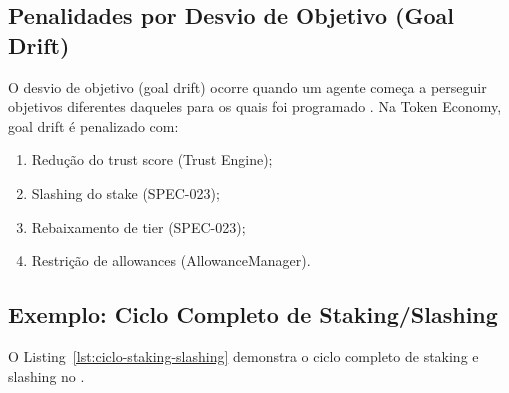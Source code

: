 \subsection{Penalidades por Desvio de Objetivo (Goal Drift)}

O desvio de objetivo (goal drift) ocorre quando um agente começa
a perseguir objetivos diferentes daqueles para os quais foi
programado \cite{russell2020inteligencia,
opencode2026spec038}. Na Token Economy, goal drift é penalizado
com:

\begin{enumerate}
\item Redução do trust score (Trust Engine);
\item Slashing do stake (SPEC-023);
\item Rebaixamento de tier (SPEC-023);
\item Restrição de allowances (AllowanceManager).
\end{enumerate}

\subsection{Exemplo: Ciclo Completo de Staking/Slashing}

O Listing~\ref{lst:ciclo-staking-slashing} demonstra o ciclo
completo de staking e slashing no \opencodeeco{}.

